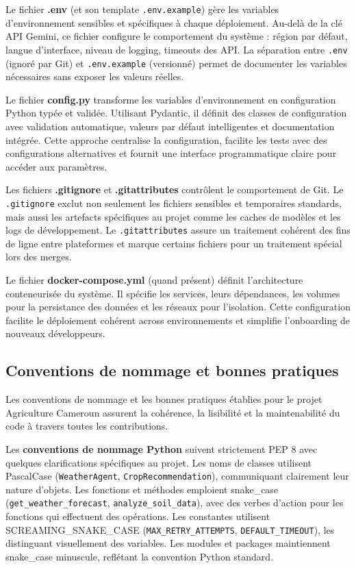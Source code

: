 Le fichier \textbf{.env} (et son template \texttt{.env.example}) gère les variables d'environnement sensibles et spécifiques à chaque déploiement. Au-delà de la clé API Gemini, ce fichier configure le comportement du système : région par défaut, langue d'interface, niveau de logging, timeouts des API. La séparation entre \texttt{.env} (ignoré par Git) et \texttt{.env.example} (versionné) permet de documenter les variables nécessaires sans exposer les valeurs réelles.

Le fichier \textbf{config.py} transforme les variables d'environnement en configuration Python typée et validée. Utilisant Pydantic, il définit des classes de configuration avec validation automatique, valeurs par défaut intelligentes et documentation intégrée. Cette approche centralise la configuration, facilite les tests avec des configurations alternatives et fournit une interface programmatique claire pour accéder aux paramètres.

Les fichiers \textbf{.gitignore} et \textbf{.gitattributes} contrôlent le comportement de Git. Le \texttt{.gitignore} exclut non seulement les fichiers sensibles et temporaires standards, mais aussi les artefacts spécifiques au projet comme les caches de modèles et les logs de développement. Le \texttt{.gitattributes} assure un traitement cohérent des fins de ligne entre plateformes et marque certains fichiers pour un traitement spécial lors des merges.

Le fichier \textbf{docker-compose.yml} (quand présent) définit l'architecture conteneurisée du système. Il spécifie les services, leurs dépendances, les volumes pour la persistance des données et les réseaux pour l'isolation. Cette configuration facilite le déploiement cohérent across environnements et simplifie l'onboarding de nouveaux développeurs.

\subsection{Conventions de nommage et bonnes pratiques}

Les conventions de nommage et les bonnes pratiques établies pour le projet Agriculture Cameroun assurent la cohérence, la lisibilité et la maintenabilité du code à travers toutes les contributions.

Les \textbf{conventions de nommage Python} suivent strictement PEP 8 avec quelques clarifications spécifiques au projet. Les noms de classes utilisent PascalCase (\texttt{WeatherAgent}, \texttt{CropRecommendation}), communiquant clairement leur nature d'objets. Les fonctions et méthodes emploient snake\_case (\texttt{get\_weather\_forecast}, \texttt{analyze\_soil\_data}), avec des verbes d'action pour les fonctions qui effectuent des opérations. Les constantes utilisent SCREAMING\_SNAKE\_CASE (\texttt{MAX\_RETRY\_ATTEMPTS}, \texttt{DEFAULT\_TIMEOUT}), les distinguant visuellement des variables. Les modules et packages maintiennent snake\_case minuscule, reflétant la convention Python standard.

